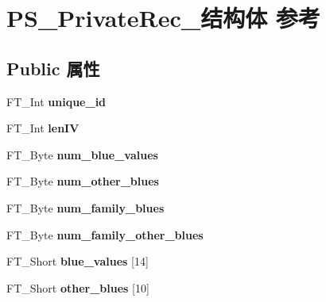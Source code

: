 \hypertarget{struct_p_s___private_rec__}{}\section{P\+S\+\_\+\+Private\+Rec\+\_\+结构体 参考}
\label{struct_p_s___private_rec__}
\subsection*{Public 属性}
\begin{DoxyCompactItemize}
\item 
\mbox{\label{struct_p_s___private_rec___ae862c1db170cfee85aa3242be9fa5d57}} 
F\+T\+\_\+\+Int {\bfseries unique\+\_\+id}
\item 
\mbox{\label{struct_p_s___private_rec___a796ebb92d96f0297ae584a911768db8b}} 
F\+T\+\_\+\+Int {\bfseries len\+IV}
\item 
\mbox{\label{struct_p_s___private_rec___ae3c56e75b5674451a7296cbb9f0a2e40}} 
F\+T\+\_\+\+Byte {\bfseries num\+\_\+blue\+\_\+values}
\item 
\mbox{\label{struct_p_s___private_rec___a149acdf871b0739f7ab13b1ac8e48a28}} 
F\+T\+\_\+\+Byte {\bfseries num\+\_\+other\+\_\+blues}
\item 
\mbox{\label{struct_p_s___private_rec___a1e8a432c78f00034c73cfc54c787b10f}} 
F\+T\+\_\+\+Byte {\bfseries num\+\_\+family\+\_\+blues}
\item 
\mbox{\label{struct_p_s___private_rec___a7370e2e89f39f7ff8923f3d1befbcfce}} 
F\+T\+\_\+\+Byte {\bfseries num\+\_\+family\+\_\+other\+\_\+blues}
\item 
\mbox{\label{struct_p_s___private_rec___ae2c23ed06e54b680473f924483685425}} 
F\+T\+\_\+\+Short {\bfseries blue\+\_\+values} \mbox{[}14\mbox{]}
\item 
\mbox{\label{struct_p_s___private_rec___a6da97f89e174d621936c75fe9b463e65}} 
F\+T\+\_\+\+Short {\bfseries other\+\_\+blues} \mbox{[}10\mbox{]}

\end{DoxyCompactItemize}
